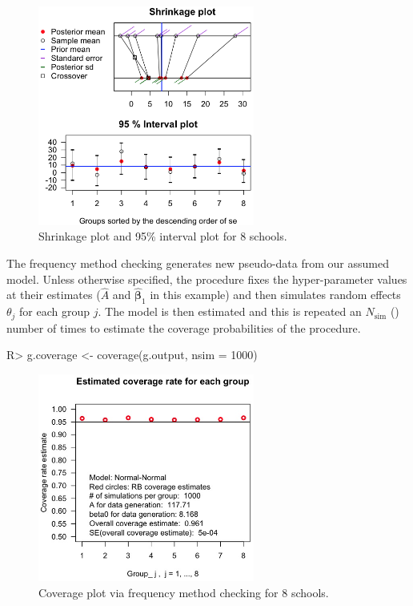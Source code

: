 \documentclass[article]{jss}
\begin{document}
\begin{figure}[h] 
\begin{center}
\includegraphics[width = 2.8in]{school1.png}
\caption{Shrinkage plot and 95\% interval plot for 8 schools.}
\label{fig:8schoolsplot}
\end{center}
\end{figure}


The frequency method checking generates new pseudo-data from our assumed model. Unless otherwise specified, the procedure fixes the hyper-parameter values at their estimates ($\hat{A}$ and $\hat{\boldsymbol{\beta}}_1$ in this example) and then simulates random effects $\theta_j$ for each group $j$. The model is then estimated and this is repeated an $N_{\textrm{sim}}$ () number of times to estimate the coverage probabilities of the procedure.  

\begin{CodeChunk}
\begin{CodeInput}
R> g.coverage <- coverage(g.output, nsim = 1000)
\end{CodeInput}
\end{CodeChunk}
\begin{figure}[h!] 
\begin{center}
\includegraphics[width = 2.8in]{school2.png}
\caption{Coverage plot via frequency method checking for 8 schools.}
\label{fig:schoolcoverage}
\end{center}
\end{figure}
\end{document}
